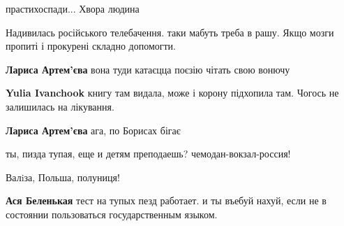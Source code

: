 \begin{itemize}

прастихоспади... Хвора людина


Надивилась російського телебачення. таки мабуть треба в рашу. Якщо мозги пропиті і прокурені складно допомогти.

\begin{itemize}

\textbf{Лариса Артем'єва} вона туди катаєцца поєзію чітать свою вонючу


\textbf{Yulia Ivanchook} книгу там видала, може і корону підхопила там. Чогось не залишилась на лікування.


\textbf{Лариса Артем'єва} ага, по Борисах бігає
\end{itemize}



ты, пизда тупая, еще и детям преподаешь? чемодан-вокзал-россия!

\begin{itemize}

Валiза, Польша, полуниця!


\textbf{Ася Беленькая} тест на тупых пезд работает. и ты въебуй нахуй, если не в состоянии пользоваться государственным языком.
\end{itemize}


\end{itemize}
